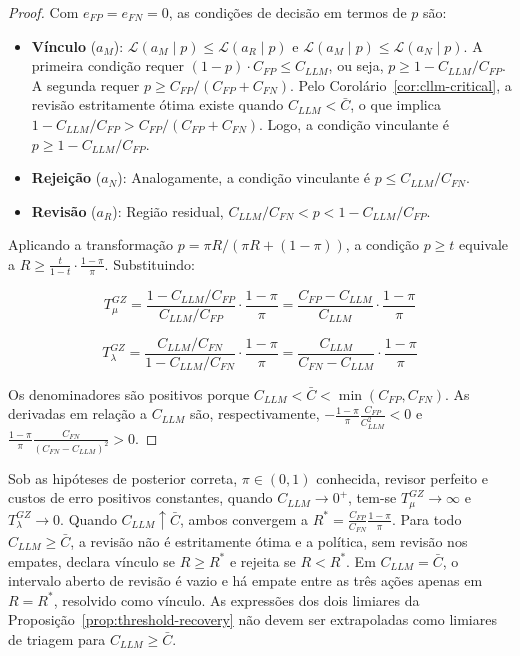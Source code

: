 \begin{proof}
Com $e_{FP} = e_{FN} = 0$, as condições de decisão em termos de $p$ são:

\begin{itemize}
\item \textbf{Vínculo} ($a_M$): $\mathcal{L}(a_M\mid p) \le \mathcal{L}(a_R\mid p)$ e $\mathcal{L}(a_M\mid p) \le \mathcal{L}(a_N\mid p)$. A primeira condição requer $(1-p) \cdot C_{FP} \le C_{LLM}$, ou seja, $p \ge 1 - C_{LLM}/C_{FP}$. A segunda requer $p \ge C_{FP}/(C_{FP}+C_{FN})$. Pelo Corolário~\ref{cor:cllm-critical}, a revisão estritamente ótima existe quando $C_{LLM}<\bar C$, o que implica $1 - C_{LLM}/C_{FP} > C_{FP}/(C_{FP}+C_{FN})$. Logo, a condição vinculante é $p \ge 1 - C_{LLM}/C_{FP}$.

\item \textbf{Rejeição} ($a_N$): Analogamente, a condição vinculante é $p \le C_{LLM}/C_{FN}$.

\item \textbf{Revisão} ($a_R$): Região residual, $C_{LLM}/C_{FN} < p < 1 - C_{LLM}/C_{FP}$.
\end{itemize}

Aplicando a transformação $p = \pi R/(\pi R + (1-\pi))$, a condição $p \ge t$ equivale a $R \ge \frac{t}{1-t} \cdot \frac{1-\pi}{\pi}$. Substituindo:

\[
T_\mu^{GZ} = \frac{1 - C_{LLM}/C_{FP}}{C_{LLM}/C_{FP}} \cdot \frac{1-\pi}{\pi} = \frac{C_{FP} - C_{LLM}}{C_{LLM}} \cdot \frac{1-\pi}{\pi}
\]

\[
T_\lambda^{GZ} = \frac{C_{LLM}/C_{FN}}{1 - C_{LLM}/C_{FN}} \cdot \frac{1-\pi}{\pi} = \frac{C_{LLM}}{C_{FN} - C_{LLM}} \cdot \frac{1-\pi}{\pi}
\]

Os denominadores são positivos porque $C_{LLM}<\bar C<\min(C_{FP},C_{FN})$. As derivadas em relação a $C_{LLM}$ são, respectivamente, $-\frac{1-\pi}{\pi}\frac{C_{FP}}{C_{LLM}^2}<0$ e $\frac{1-\pi}{\pi}\frac{C_{FN}}{(C_{FN}-C_{LLM})^2}>0$.
\end{proof}

\begin{corollary}
\label{cor:gz-deterministic}
Sob as hipóteses de posterior correta, $\pi\in(0,1)$ conhecida, revisor perfeito e custos de erro positivos constantes, quando $C_{LLM}\to0^+$, tem-se $T_\mu^{GZ}\to\infty$ e $T_\lambda^{GZ}\to0$. Quando $C_{LLM}\uparrow\bar C$, ambos convergem a $R^*=\frac{C_{FP}}{C_{FN}}\frac{1-\pi}{\pi}$. Para todo $C_{LLM}\ge\bar C$, a revisão não é estritamente ótima e a política, sem revisão nos empates, declara vínculo se $R\ge R^*$ e rejeita se $R<R^*$. Em $C_{LLM}=\bar C$, o intervalo aberto de revisão é vazio e há empate entre as três ações apenas em $R=R^*$, resolvido como vínculo. As expressões dos dois limiares da Proposição~\ref{prop:threshold-recovery} não devem ser extrapoladas como limiares de triagem para $C_{LLM}\ge\bar C$.
\end{corollary}

